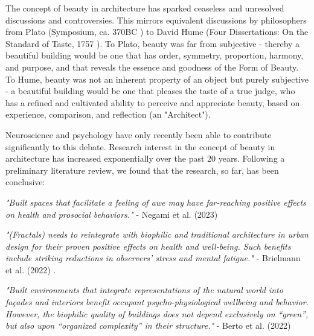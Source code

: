 \documentclass{article}
\begin{document}
\clearpage
\begin{multicols}{2}

The concept of beauty in architecture has sparked ceaseless and unresolved discussions and controversies. This mirrors equivalent discussions by philosophers from Plato (Symposium, ca. 370BC \cite{plato_symposium_1795}) to David Hume (Four Dissertations: On the Standard of Taste, 1757 \cite{hume_iv_1757}). To Plato, beauty was far from subjective - thereby a beautiful building would be one that has order, symmetry, proportion, harmony, and purpose, and that reveals the essence and goodness of the Form of Beauty. To Hume, beauty was not an inherent property of an object but purely subjective - a beautiful building would be one that pleases the taste of a true judge, who has a refined and cultivated ability to perceive and appreciate beauty, based on experience, comparison, and reflection (an "Architect").

Neuroscience and psychology have only recently been able to contribute significantly to this debate. Research interest in the concept of beauty in architecture has increased exponentially over the past 20 years. Following a preliminary literature review, we found that the research, so far, has been conclusive:


\textit{"Built spaces that facilitate a feeling of awe may have far-reaching positive effects on health and prosocial behaviors."} \newline - Negami et al. (2023) \cite{negami_how_2023}

\textit{"(Fractals) needs to reintegrate with biophilic and traditional architecture in urban design for their proven positive effects on health and well-being. Such beneﬁts include striking reductions in observers’ stress and mental fatigue."} \newline - Brielmann et al. (2022) \cite{brielmann_what_2022}.

\textit{"Built environments that integrate representations of the natural world into façades and interiors benefit occupant psycho-physiological wellbeing and behavior. However, the biophilic quality of buildings does not depend exclusively on “green”, but also upon “organized complexity” in their structure."} - Berto et al. (2022) \cite{berto_biophilic_2022}


\end{multicols}
\end{document}
